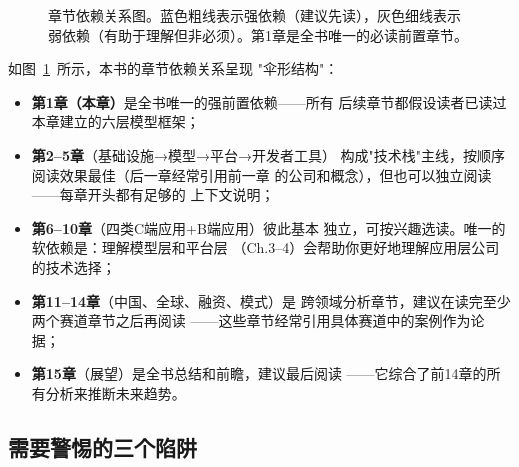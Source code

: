 \begin{figure}[htbp]
\caption{章节依赖关系图。蓝色粗线表示强依赖（建议先读），灰色细线表示
  弱依赖（有助于理解但非必须）。第1章是全书唯一的必读前置章节。}
\label{fig:chapter-deps}
\end{figure}

如图~\ref{fig:chapter-deps}~所示，本书的章节依赖关系呈现
"伞形结构"：

\begin{itemize}
  \item \textbf{第1章（本章）}是全书唯一的强前置依赖——所有
    后续章节都假设读者已读过本章建立的六层模型框架；
  \item \textbf{第2--5章}（基础设施→模型→平台→开发者工具）
    构成"技术栈"主线，按顺序阅读效果最佳（后一章经常引用前一章
    的公司和概念），但也可以独立阅读——每章开头都有足够的
    上下文说明；
  \item \textbf{第6--10章}（四类C端应用+B端应用）彼此基本
    独立，可按兴趣选读。唯一的软依赖是：理解模型层和平台层
    （Ch.3--4）会帮助你更好地理解应用层公司的技术选择；
  \item \textbf{第11--14章}（中国、全球、融资、模式）是
    跨领域分析章节，建议在读完至少两个赛道章节之后再阅读
    ——这些章节经常引用具体赛道中的案例作为论据；
  \item \textbf{第15章}（展望）是全书总结和前瞻，建议最后阅读
    ——它综合了前14章的所有分析来推断未来趋势。
\end{itemize}

\subsection{需要警惕的三个陷阱}

